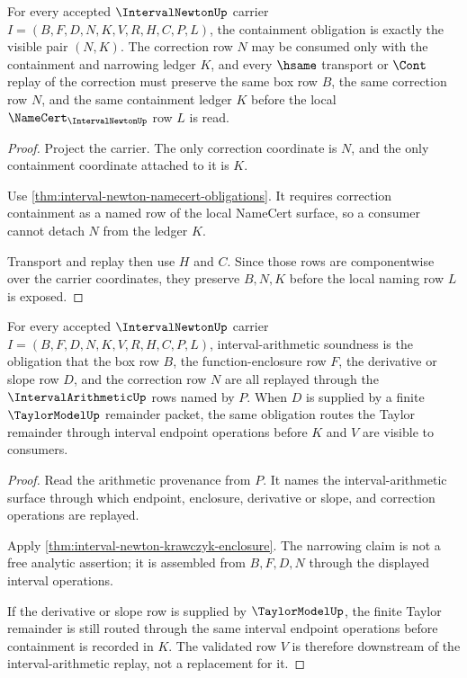 \begin{theorem}
\label{thm:interval-newton-containment-obligation}
For every accepted $\IntervalNewtonUp$ carrier $I=(B,F,D,N,K,V,R,H,C,P,L)$, the containment obligation is exactly the visible pair $(N,K)$. The correction row $N$ may be consumed only with the containment and narrowing ledger $K$, and every $\hsame$ transport or $\Cont$ replay of the correction must preserve the same box row $B$, the same correction row $N$, and the same containment ledger $K$ before the local $\NameCert_{\IntervalNewtonUp}$ row $L$ is read.
\end{theorem}
\begin{proof}
Project the carrier. The only correction coordinate is $N$, and the only containment coordinate attached to it is $K$.

Use \autoref{thm:interval-newton-namecert-obligations}. It requires correction containment as a named row of the local NameCert surface, so a consumer cannot detach $N$ from the ledger $K$.

Transport and replay then use $H$ and $C$. Since those rows are componentwise over the carrier coordinates, they preserve $B,N,K$ before the local naming row $L$ is exposed.
\end{proof}

\begin{theorem}
\label{thm:interval-newton-interval-arithmetic-soundness-obligation}
For every accepted $\IntervalNewtonUp$ carrier $I=(B,F,D,N,K,V,R,H,C,P,L)$, interval-arithmetic soundness is the obligation that the box row $B$, the function-enclosure row $F$, the derivative or slope row $D$, and the correction row $N$ are all replayed through the $\IntervalArithmeticUp$ rows named by $P$. When $D$ is supplied by a finite $\TaylorModelUp$ remainder packet, the same obligation routes the Taylor remainder through interval endpoint operations before $K$ and $V$ are visible to consumers.
\end{theorem}
\begin{proof}
Read the arithmetic provenance from $P$. It names the interval-arithmetic surface through which endpoint, enclosure, derivative or slope, and correction operations are replayed.

Apply \autoref{thm:interval-newton-krawczyk-enclosure}. The narrowing claim is not a free analytic assertion; it is assembled from $B,F,D,N$ through the displayed interval operations.

If the derivative or slope row is supplied by $\TaylorModelUp$, the finite Taylor remainder is still routed through the same interval endpoint operations before containment is recorded in $K$. The validated row $V$ is therefore downstream of the interval-arithmetic replay, not a replacement for it.
\end{proof}

